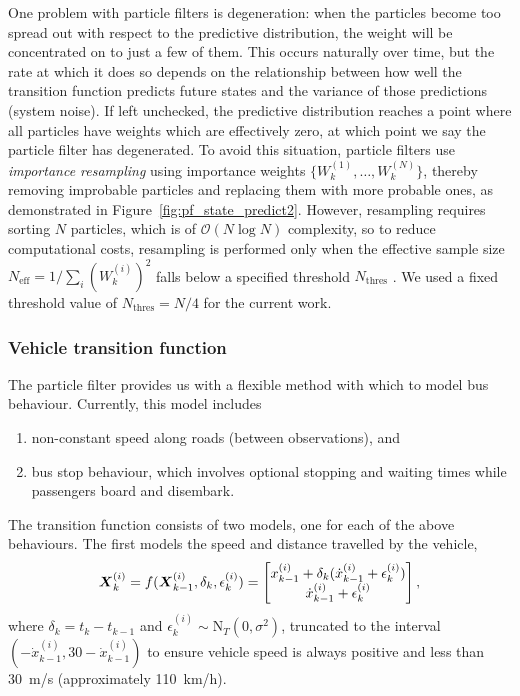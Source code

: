 One problem with particle filters is degeneration:
when the particles become too spread out with respect to the predictive distribution,
the weight will be concentrated on to just a few of them.
This occurs naturally over time, but the rate at which it does so depends 
on the relationship between how well the transition function predicts future states
and the variance of those predictions (system noise).
If left unchecked, the predictive distribution reaches a point
where all particles have weights which are effectively zero,
at which point we say the particle filter has degenerated.
To avoid this situation,
particle filters use \emph{importance resampling}
using importance weights $\{W_k^{(1)}, \ldots, W_k^{(N)}\}$,
thereby removing improbable particles and replacing them with more probable ones,
as demonstrated in Figure~\ref{fig:pf_state_predict2}.
However, resampling requires sorting $N$ particles,
which is of $\mathcal{O}(N\log N)$ complexity,
so to reduce computational costs, resampling is performed only when
the effective sample size $N_{\text{eff}} = 1 / \sum_i (W_k^{(i)})^2$
falls below a specified threshold $N_{\text{thres}}$
\citep{Gustafsson_2002}.
We used a fixed threshold value of $N_{\text{thres}} = N/4$
for the current work.


\subsubsection{Vehicle transition function}
\label{sec:pf_prediction}

The particle filter provides us with a flexible method
with which to model bus behaviour.
Currently, this model includes
\begin{enumerate}
\item non-constant speed along roads (between observations), and
\item bus stop behaviour, which involves optional stopping and waiting times
    while passengers board and disembark.
\end{enumerate}
The transition function consists of two models,
one for each of the above behaviours.
The first models the speed and distance travelled by the vehicle,
\begin{equation}
\label{eq:trans_newton}
\mbox{$\boldsymbol{X}$}_k^{(i)} = f(\mbox{$\boldsymbol{X}$}_{k-1}^{(i)}, \delta_k, \epsilon_k^{(i)}) = 
    \begin{bmatrix}
        x_{k-1}^{(i)} + \delta_k(\dot x_{k-1}^{(i)} + \epsilon_k^{(i)}) \\
        \dot x_{k-1}^{(i)} + \epsilon_k^{(i)}
    \end{bmatrix},
\end{equation}
where $\delta_k = t_k - t_{k-1}$
and $\epsilon_k^{(i)}\sim\mathrm{N}_T(0, \sigma^2)$, truncated to the interval
$(-\dot x_{k-1}^{(i)}, 30 - \dot x_{k-1}^{(i)})$
to ensure vehicle speed is always positive and less than 30~m/s
(approximately 110~km/h).


